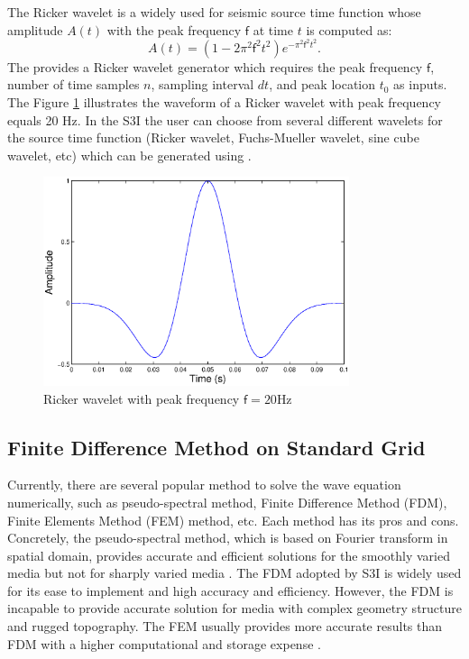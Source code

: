 \documentclass[11pt,titlepage]{article}
\newcommand{\sff}{\mathsf{f}}
\theoremstyle{plain}
\theoremstyle{definition}
\theoremstyle{remark}
\numberwithin{equation}{section}
\begin{document}
The Ricker wavelet is a widely used for seismic source time function whose amplitude $A(t)$ with the peak frequency $\sff$ at time $t$ is computed as:
\begin{equation}
A(t)=(1-2\pi^2 \sff^2 t^2)e^{-\pi^2 \sff^2 t^2}.
\end{equation}
The  provides a Ricker wavelet generator which requires the peak frequency $\sff$, number of time samples $n$, 
sampling interval $dt$, and peak location $t_0$ as inputs. The Figure \ref{fig:ricker} illustrates the waveform of a Ricker wavelet with peak frequency equals 20 Hz. In the S3I the user can choose from several different wavelets for the source time function (Ricker wavelet, Fuchs-Mueller wavelet, sine cube wavelet, etc) which can be generated using .

\begin{figure}[htbp]
\centering
\includegraphics[width=0.8\textwidth]{Fig/ricker}
\caption{Ricker wavelet with peak frequency $\sff=20$Hz}
\label{fig:ricker}
\end{figure}


\subsection{Finite Difference Method on Standard Grid}
Currently, there are several popular method to solve the wave equation numerically, such as pseudo-spectral method, Finite Difference Method (FDM), Finite Elements Method (FEM) method, etc. Each method has its pros and cons. Concretely, the pseudo-spectral method, which is based on Fourier transform in spatial domain, provides accurate and efficient solutions for the smoothly varied media but not for sharply varied media \cite{KreOli1972,For1975,For1987}. The FDM \cite{AlfKelAO1974,Dab1986} adopted by S3I is widely used for its ease to implement and high accuracy and efficiency. However, the FDM is incapable to provide accurate solution for media with complex geometry structure and rugged topography. The FEM usually provides more accurate results than FDM with a higher computational and storage expense \cite{Kur1984}. 
\end{document}
